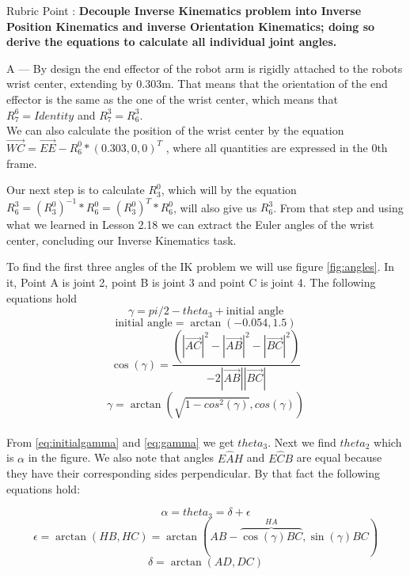 \documentclass[a4paper,11pt]{article}
\newcounter{question}
\newcommand\Que[1]{%
	   \leavevmode\par
	   \stepcounter{question}
	   \noindent
	   Rubric Point \thequestion :  {\bf #1}\par}
\newcommand\Ans[2][]{%
    \leavevmode\par\noindent
   {\leftskip37pt
    A --- \textbf{#1}#2\par}}
\begin{document}
\Que{ Decouple Inverse Kinematics problem into Inverse Position Kinematics and inverse Orientation Kinematics; doing so derive the equations to calculate all individual joint angles.}
\Ans{By design the end effector of the robot arm is rigidly attached to the robots wrist center, extending by 0.303m. That means that the orientation of the end effector is the same as the one of the wrist center, which means that $R^6_7 = Identity$ and $R^3_7 = R^3_6$. \\
We can also calculate the position of the wrist center by the equation $\vec{WC}= \vec{EE} - R^0_6*(0.303, 0 , 0)^T$ , where all quantities are expressed in the 0th frame.

Our next step is to calculate $R^0_3$, which will by the equation $R^3_6 = (R^0_3)^{-1}*R^0_6 = (R^0_3)^T*R^0_6$, will also give us $R^3_6$. From that step and using what we learned in Lesson 2.18 we can extract the Euler angles of the wrist center, concluding our Inverse Kinematics task.

To find the first three angles of the IK problem we will use figure \ref{fig:angles}. In it, Point A is joint 2, point B is joint 3 and point C is joint 4. The following equations hold
\begin{equation}
\gamma = pi/2 - theta_3 + \text{initial angle}
\label{eq:initialgamma}
\end{equation}
\begin{equation}
\text{initial angle} = \arctan(-0.054, 1.5)
\end{equation}
\begin{equation}
\cos(\gamma) = \frac{\left(|\vec{AC}|^2 - |\vec{AB}|^2 - |\vec{BC}|^2\right)}{-2|\vec{AB}||\vec{BC}|}
\end{equation}
\begin{equation}
\gamma = \arctan(\sqrt{1-cos^2(\gamma)}, cos(\gamma))
\label{eq:gamma}
\end{equation}
\\
From \ref{eq:initialgamma} and \ref{eq:gamma} we get $theta_3$. Next we find $theta_2$ which is $\alpha$ in the figure. We also note that angles $E\hat{A}H$ and $E\hat{C}B$ are equal because they have their corresponding sides perpendicular. By that fact the following equations hold:

\begin{equation}
\alpha = theta_3 = \delta + \epsilon
\label{eq:initialtheta3}
\end{equation}
\begin{equation}
\epsilon =  \arctan(HB,HC) = \arctan(AB - \overbrace{\cos(\gamma)BC}^{HA} ,\sin(\gamma)BC)
\end{equation}
\begin{equation}
\delta =  \arctan(AD,DC)
\end{equation}
}
\end{document}
